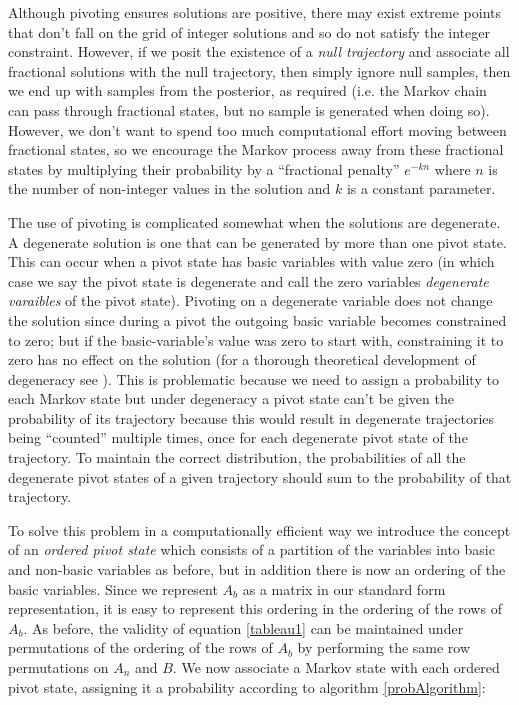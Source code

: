 \documentclass{article}
\begin{document}
Although pivoting ensures solutions are positive, there may exist extreme points that don't fall on the grid of integer solutions and so do not satisfy the integer constraint. However, if we posit the existence of a \textit{null trajectory} and associate all fractional solutions with the null trajectory, then simply ignore null samples, then we end up with samples from the posterior, as required (i.e. the Markov chain can pass through fractional states, but no sample is generated when doing so). However, we don't want to spend too much computational effort moving between fractional states, so we encourage the Markov process away from these fractional states by multiplying their probability by a ``fractional penalty'' $e^{-kn}$ where $n$ is the number of non-integer values in the solution and $k$ is a constant parameter.

The use of pivoting is complicated somewhat when the solutions are degenerate. A degenerate solution is one that can be generated by more than one pivot state. This can occur when a pivot state has basic variables with value zero (in which case we say the pivot state is degenerate and call the zero variables \textit{degenerate varaibles} of the pivot state). Pivoting on a degenerate variable does not change the solution since during a pivot the outgoing basic variable becomes constrained to zero; but if the basic-variable's value was zero to start with, constraining it to zero has no effect on the solution (for a thorough theoretical development of degeneracy see \cite{zornig93degeneracy}). This is problematic because we need to assign a probability to each Markov state but under degeneracy a pivot state can't be given the probability of its trajectory because this would result in degenerate trajectories being ``counted'' multiple times, once for each degenerate pivot state of the trajectory. To maintain the correct distribution, the probabilities of all the degenerate pivot states of a given trajectory should sum to the probability of that trajectory.

To solve this problem in a computationally efficient way we introduce the concept of an \textit{ordered pivot state} which consists of a partition of the variables into basic and non-basic variables as before, but in addition there is now an ordering of the basic variables. Since we represent $A_b$ as a matrix in our standard form representation, it is easy to represent this ordering in the ordering of the rows of $A_b$. As before, the validity of equation \ref{tableau1} can be maintained under permutations of the ordering of the rows of $A_b$ by performing the same row permutations on $A_n$ and $B$. We now associate a Markov state with each ordered pivot state, assigning it a probability according to algorithm \ref{probAlgorithm}:
\end{document}
